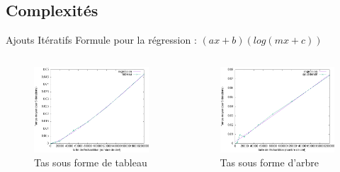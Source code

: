 \documentclass[11pt]{beamer}
\begin{document}
\subsection{Complexités}
\begin{frame}{Ajouts Itératifs}
Formule pour la régression : $(ax +b) (log (mx +c))$

\begin{columns}[t]
  \begin{column}{5cm}
  
\begin{figure}[hbtp]
\centering
\includegraphics[width=5cm]{../Images/svg courbes pour rapport/regression_ajout_iteratif_tab.png}
\caption{Tas sous forme de tableau}
\label{fig1}
\end{figure}


  \end{column}
  
  \begin{column}{5cm}
  
\begin{figure}[hbtp]
\centering
\includegraphics[width=5cm]{../Images/svg courbes pour rapport/regression_ajout_iteratif_arbre.png}
\caption{Tas sous forme d'arbre}
\label{fig2}
\end{figure}
  
  
  \end{column}
 \end{columns}  



\end{frame}
\end{document}
